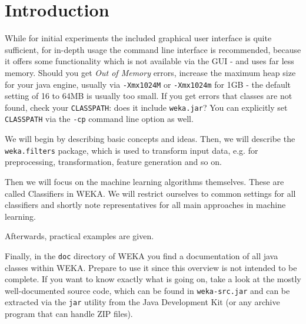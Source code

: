 %
%
%
%


\section{Introduction}

While for initial experiments the included graphical user interface is quite sufficient, for in-depth usage the command line interface is recommended, because it offers some functionality which is not available via the GUI - and uses far less memory. Should you get \textit{Out of Memory} errors, increase the maximum heap size for your java engine, usually via \texttt{-Xmx1024M} or \texttt{-Xmx1024m} for 1GB - the default setting of 16 to 64MB is usually too small. If you get errors that classes are not found, check your \texttt{CLASSPATH}: does it include \texttt{weka.jar}? You can explicitly set \texttt{CLASSPATH} via the \texttt{-cp} command line option as well.

We will begin by describing basic concepts and ideas. Then, we will describe the \texttt{weka.filters} package, which is used to transform input data, e.g. for preprocessing, transformation, feature generation and so on.

Then we will focus on the machine learning algorithms themselves. These are called Classifiers in WEKA. We will restrict ourselves to common settings for all classifiers and shortly note representatives for all main approaches in machine learning.

Afterwards, practical examples are given.

Finally, in the \texttt{doc} directory of WEKA you find a documentation of all java classes within WEKA. Prepare to use it since this overview is not intended to be complete. If you want to know exactly what is going on, take a look at the mostly well-documented source code, which can be found in \texttt{weka-src.jar} and can be extracted via the \texttt{jar} utility from the Java Development Kit (or any archive program that can handle ZIP files).

